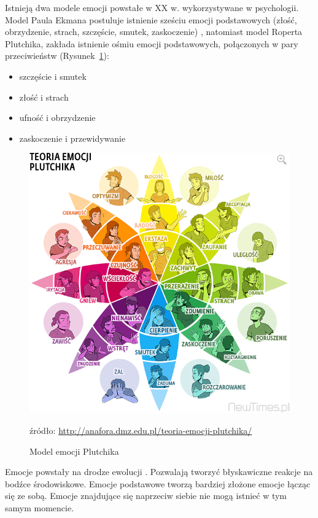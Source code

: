 \documentclass[a4paper,12pt,twoside,openany]{report}
\newcommand{\Rys}[1]{(Rysunek~\ref{#1})}
\newcommand{\zrodlo}[1]{\captionsetup{font=scriptsize}\caption*{źródło: \url{#1}}}
\begin{document}
Istnieją dwa modele emocji powstałe w XX w. wykorzystywane w psychologii.
Model Paula Ekmana postuluje istnienie sześciu emocji podstawowych (złość, obrzydzenie, strach, szczęście, smutek, zaskoczenie) \cite{Eisner2015},
natomiast model Roperta Plutchika\cite{Eisner2015}, zakłada istnienie ośmiu emocji podstawowych, połączonych w pary przeciwieństw \Rys{rys:intro:plutnik}:
\begin{itemize}
	\item szczęście i smutek
	\item złość i strach
	\item ufność i obrzydzenie
	\item zaskoczenie i przewidywanie
\end{itemize}
\begin{figure}[h]
	\centering
	\includegraphics[width=\textwidth]{Plutchik-Emotions-Wheel}
	\caption{Model emocji Plutchika}
	\zrodlo{http://anafora.dmz.edu.pl/teoria-emocji-plutchika/}
	\label{rys:intro:plutnik}
\end{figure}
Emocje powstały na drodze ewolucji \cite{Plutchik2001}.
Pozwalają tworzyć błyskawiczne reakcje na bodźce środowiskowe.
Emocje podstawowe tworzą bardziej złożone emocje łącząc się ze sobą.
Emocje znajdujące się naprzeciw siebie nie mogą istnieć w tym samym momencie. 
\end{document}
